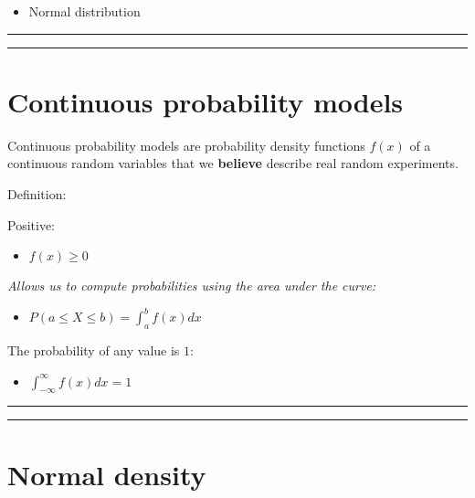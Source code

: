 \documentclass[
]{book}
\providecommand{\tightlist}{%
  \setlength{\itemsep}{0pt}\setlength{\parskip}{0pt}}
\begin{document}
\begin{itemize}
\tightlist
\item
  Normal distribution
\end{itemize}

\begin{center}\rule{0.5\linewidth}{0.5pt}\end{center}

\begin{center}\rule{0.5\linewidth}{0.5pt}\end{center}

\hypertarget{continuous-probability-models-1}{%
\section{Continuous probability models}\label{continuous-probability-models-1}}

Continuous probability models are probability density functions \(f(x)\) of a continuous random variables that we \textbf{believe} describe real random experiments.

Definition:

Positive:

\begin{itemize}
\tightlist
\item
  \(f(x) \geq 0\)
\end{itemize}

\emph{Allows us to compute probabilities using the area under the curve:}

\begin{itemize}
\tightlist
\item
  \(P(a\leq X \leq b)=\int_{a}^{b} f(x) dx\)
\end{itemize}

The probability of any value is \(1\):

\begin{itemize}
\tightlist
\item
  \(\int_{-\infty}^{\infty} f(x) dx = 1\)
\end{itemize}

\begin{center}\rule{0.5\linewidth}{0.5pt}\end{center}

\begin{center}\rule{0.5\linewidth}{0.5pt}\end{center}

\hypertarget{normal-density}{%
\section{Normal density}\label{normal-density}}
\end{document}
